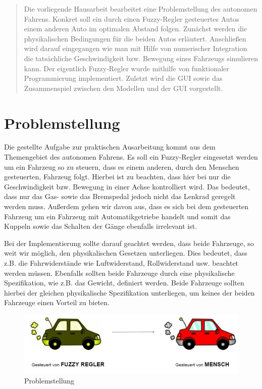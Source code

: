 \documentclass[12pt,a4paper,bibliography=totocnumbered,listof=totocnumbered, abstracton]{scrartcl}
\theoremstyle{Umgebung}
\begin{document}
\begin{abstract} 
	Die vorliegende Hausarbeit bearbeitet eine Problemstellung des autonomen Fahrens. Konkret soll ein durch einen Fuzzy-Regler gesteuertes Autos einem anderen Auto im optimalen Abstand folgen. Zunächst werden die physikalischen Bedingungen für die beiden Autos erläutert. Anschließen wird darauf eingegangen wie man mit Hilfe von numerischer Integration die tatsächliche Geschwindigkeit bzw. Bewegung eines Fahrzeugs simulieren kann. Der eigentlich Fuzzy-Regler wurde mithilfe von funktionaler Programmierung implementiert. Zuletzt wird die GUI sowie das Zusammenspiel zwischen den Modellen und der GUI vorgestellt.

\end{abstract} 
\newpage

\section{Problemstellung}

Die gestellte Aufgabe zur praktischen Ausarbeitung kommt aus dem Themengebiet des autonomen Fahrens. Es soll ein Fuzzy-Regler eingesetzt werden um ein Fahrzeug so zu steuern, dass es einem anderen, durch den Menschen gesteuerten, Fahrzeug folgt.  Hierbei ist zu beachten, dass hier bei nur die Geschwindigkeit bzw. Bewegung in einer Achse kontrolliert wird. Das bedeutet, dass nur das Gas- sowie das Bremspedal jedoch nicht das Lenkrad geregelt werden muss. Außerdem gehen wir davon aus, dass es sich bei dem gesteuerten Fahrzeug um ein Fahrzeug mit Automatikgetriebe handelt und somit das Kuppeln sowie das Schalten der Gänge ebenfalls irrelevant ist. 

Bei der Implementierung sollte darauf geachtet werden, dass beide Fahrzeuge, so weit wir möglich, den physikalischen Gesetzen unterliegen. Dies bedeutet, dass z.B. die Fahrwiderstände wie Luftwiderstand, Rollwiderstand usw. beachtet werden müssen. Ebenfalls sollten beide Fahrzeuge durch eine physikalische Spezifikation, wie z.B. das Gewicht, definiert werden. Beide Fahrzeuge sollten hierbei der gleichen physikalische Spezifikation unterliegen, um keines der beiden Fahrzeuge einen Vorteil zu bieten.

\begin{figure}
	\centering
	\includegraphics[width=0.9\linewidth]{img/practical/problem}
	\caption{Problemstellung}
	\label{fig:problem}
\end{figure}
\end{document}

